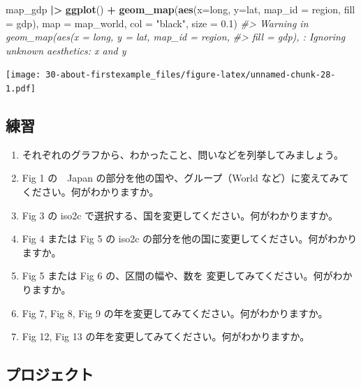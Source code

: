 \documentclass[
  xelatex, ja=standard]{bxjsbook}
\newenvironment{Shaded}{\begin{snugshade}}{\end{snugshade}}
\newcommand{\AttributeTok}[1]{\textcolor[rgb]{0.13,0.29,0.53}{#1}}
\newcommand{\CommentTok}[1]{\textcolor[rgb]{0.56,0.35,0.01}{\textit{#1}}}
\newcommand{\FloatTok}[1]{\textcolor[rgb]{0.00,0.00,0.81}{#1}}
\newcommand{\FunctionTok}[1]{\textcolor[rgb]{0.13,0.29,0.53}{\textbf{#1}}}
\newcommand{\NormalTok}[1]{#1}
\newcommand{\SpecialCharTok}[1]{\textcolor[rgb]{0.81,0.36,0.00}{\textbf{#1}}}
\newcommand{\StringTok}[1]{\textcolor[rgb]{0.31,0.60,0.02}{#1}}
\providecommand{\tightlist}{%
  \setlength{\itemsep}{0pt}\setlength{\parskip}{0pt}}
\theoremstyle{definition}
\theoremstyle{definition}
\theoremstyle{definition}
\theoremstyle{definition}
\theoremstyle{remark}
\begin{document}
\begin{Shaded}
\begin{Highlighting}[]
\NormalTok{map\_gdp }\SpecialCharTok{|\textgreater{}}
  \FunctionTok{ggplot}\NormalTok{() }\SpecialCharTok{+}
  \FunctionTok{geom\_map}\NormalTok{(}\FunctionTok{aes}\NormalTok{(}\AttributeTok{x=}\NormalTok{long, }\AttributeTok{y=}\NormalTok{lat, }\AttributeTok{map\_id =}\NormalTok{ region, }\AttributeTok{fill =}\NormalTok{ gdp), }\AttributeTok{map =}\NormalTok{ map\_world, }\AttributeTok{col =} \StringTok{"black"}\NormalTok{, }\AttributeTok{size =} \FloatTok{0.1}\NormalTok{) }
\CommentTok{\#\textgreater{} Warning in geom\_map(aes(x = long, y = lat, map\_id = region,}
\CommentTok{\#\textgreater{} fill = gdp), : Ignoring unknown aesthetics: x and y}
\end{Highlighting}
\end{Shaded}

\texttt{[image: 30-about-firstexample\_files/figure-latex/unnamed-chunk-28-1.pdf]}

\hypertarget{ux7df4ux7fd2-5}{%
\subsection{練習}\label{ux7df4ux7fd2-5}}

\begin{enumerate}
\def\labelenumi{\arabic{enumi}.}
\tightlist
\item
  それぞれのグラフから、わかったこと、問いなどを列挙してみましょう。
\item
  Fig 1 の　Japan の部分を他の国や、グループ（World など）に変えてみてください。何がわかりますか。
\item
  Fig 3 の iso2c で選択する、国を変更してください。何がわかりますか。
\item
  Fig 4 または Fig 5 の iso2c の部分を他の国に変更してください。何がわかりますか。
\item
  Fig 5 または Fig 6 の、区間の幅や、数を 変更してみてください。何がわかりますか。
\item
  Fig 7, Fig 8, Fig 9 の年を変更してみてください。何がわかりますか。
\item
  Fig 12, Fig 13 の年を変更してみてください。何がわかりますか。
\end{enumerate}

\hypertarget{ux30d7ux30edux30b8ux30a7ux30afux30c8-1}{%
\subsection{プロジェクト}\label{ux30d7ux30edux30b8ux30a7ux30afux30c8-1}}
\end{document}
